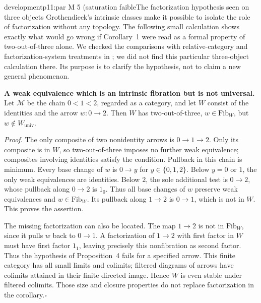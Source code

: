 \begin{dcomment}{development}{p11:par M 5 (saturation faible}{The factorization hypothesis seen on three objects}
Grothendieck's intrinsic classes make it possible to isolate the role of factorization without any topology. The following small calculation shows exactly what would go wrong if Corollary~1 were read as a formal property of two-out-of-three alone. We checked the comparisons with relative-category and factorization-system treatments in \citet{Riehl2014,Rosicky2021Remarks}; we did not find this particular three-object calculation there. Its purpose is to clarify the hypothesis, not to claim a new general phenomenon.

\textbf{A weak equivalence which is an intrinsic fibration but is not universal.}\ours
Let $\mathcal M$ be the chain $0<1<2$, regarded as a category, and let $W$ consist of the identities and the arrow $w:0\to2$. Then $W$ has two-out-of-three, $w\in\mathrm{Fib}_W$, but $w\notin W_{\mathrm{univ}}$.

\emph{Proof.} The only composite of two nonidentity arrows is $0\to1\to2$. Only its composite is in $W$, so two-out-of-three imposes no further weak equivalence; composites involving identities satisfy the condition. Pullback in this chain is minimum. Every base change of $w$ is $0\to y$ for $y\in\{0,1,2\}$. Below $y=0$ or $1$, the only weak equivalences are identities. Below $2$, the sole additional test is $0\to2$, whose pullback along $0\to2$ is $1_0$. Thus all base changes of $w$ preserve weak equivalences and $w\in\mathrm{Fib}_W$. Its pullback along $1\to2$ is $0\to1$, which is not in $W$. This proves the assertion.

The missing factorization can also be located. The map $1\to2$ is not in $\mathrm{Fib}_W$, since it pulls $w$ back to $0\to1$. A factorization of $1\to2$ with first factor in $W$ must have first factor $1_1$, leaving precisely this nonfibration as second factor. Thus the hypothesis of Proposition~4 fails for a specified arrow. This finite category has all small limits and colimits; filtered diagrams of arrows have colimits attained in their finite directed image. Hence $W$ is even stable under filtered colimits. Those size and closure properties do not replace factorization in the corollary.\hfill$\square$
\end{dcomment}

